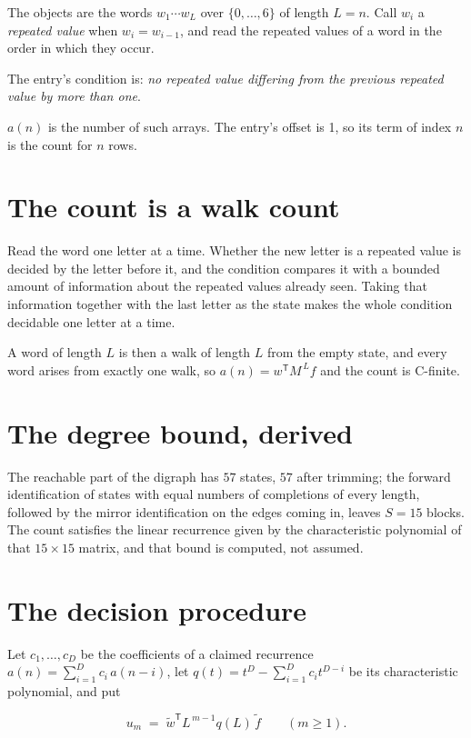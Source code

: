 \documentclass[11pt]{article}
\theoremstyle{definition}
\begin{document}
The objects are the words $w_1\cdots w_L$ over $\{0,\dots,6\}$ of length $L = n$. Call $w_i$ a {\itshape repeated value} when $w_i = w_{i-1}$, and read the repeated values of a word in the order in which they occur.

The entry's condition is: {\itshape no repeated value differing from the previous repeated value by more than one}.

$a(n)$ is the number of such arrays. The entry's offset is 1, so its term of index $n$ is the count for $n$ rows.

\section{The count is a walk count}

Read the word one letter at a time. Whether the new letter is a repeated value is decided by the letter before it, and the condition compares it with a bounded amount of information about the repeated values already seen. Taking that information together with the last letter as the state makes the whole condition decidable one letter at a time.

A word of length $L$ is then a walk of length $L$ from the empty state, and every word arises from exactly one walk, so $a(n) = w^{\mathsf T}M^{\,L}f$ and the count is C-finite.

\section{The degree bound, derived}

The reachable part of the digraph has $57$ states, $57$ after trimming; the forward identification of states with equal numbers of completions of every length, followed by the mirror identification on the edges coming in, leaves $S = 15$ blocks. The count satisfies the linear recurrence given by the characteristic polynomial of that $15\times15$ matrix, and that bound is computed, not assumed.

\section{The decision procedure}

Let $c_1,\dots,c_D$ be the coefficients of a claimed recurrence $a(n) = \sum_{i=1}^{D} c_i\,a(n-i)$, let $q(t) = t^{D} - \sum_{i=1}^{D} c_i t^{D-i}$ be its characteristic polynomial, and put

\[u_m \;=\; \tilde w^{\mathsf T} L^{\,m-1} q(L)\,\tilde f \qquad (m \ge 1).\]
\end{document}

